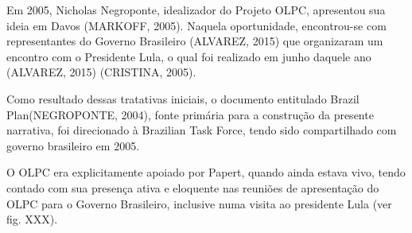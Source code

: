 \documentclass[
12pt,		%
openright,	%
twoside,  %
a4paper,			%
chapter=TITLE,		%
english,			%
french,				%
spanish,			%
brazil				%
]{USPSC-classe/USPSC}
\begin{document}
Em 2005, Nicholas Negroponte, idealizador do Projeto OLPC, apresentou sua ideia em Davos (MARKOFF, 2005). Naquela oportunidade, encontrou-se com representantes do Governo Brasileiro (ALVAREZ, 2015) que organizaram um encontro com o Presidente Lula, o qual foi realizado em junho daquele ano (ALVAREZ, 2015) (CRISTINA, 2005).




Como resultado dessas tratativas iniciais, o documento entitulado \textquotedbl Brazil Plan\textquotedbl   (NEGROPONTE, 2004), fonte prim\'aria para a constru\c{c}\~ao da presente narrativa, foi direcionado \`a \textquotedbl Brazilian Task Force\textquotedbl , tendo sido compartilhado com governo brasileiro em 2005.




O OLPC era explicitamente apoiado por Papert, quando ainda estava vivo, tendo contado com sua presen\c{c}a ativa e eloquente nas reuni\~oes de apresenta\c{c}\~ao do OLPC para o Governo Brasileiro, inclusive numa visita ao presidente Lula (ver fig. XXX).
\end{document}

